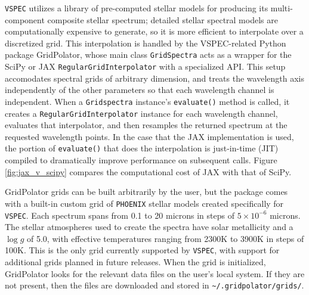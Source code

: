 \documentclass[twocolumn,linenumbers]{aastex631}
\newcommand{\teff}{$T_{\rm eff}$}
\newcommand{\TJ}[1]{\textcolor{tedcommentcolor}{#1}}
\newcommand{\vspec}[1]{\texttt{VSPEC}#1}
\begin{document}
\vspec{} utilizes a library of pre-computed stellar models for producing its multi-component composite stellar spectrum; detailed stellar spectral models are computationally expensive to generate, so it is more efficient to interpolate over a discretized grid. This interpolation is handled by the VSPEC-related Python package GridPolator, whose main class \texttt{GridSpectra} acts as a wrapper for the SciPy \citep{virtanen2020} or JAX \citep{bradbury2018} \texttt{RegularGridInterpolator} with a specialized API. This setup accomodates spectral grids of arbitrary dimension, and treats the wavelength axis independently of the other parameters so that each wavelength channel is independent. When a \texttt{Gridspectra} instance's \texttt{evaluate()} method is called, it creates a \texttt{RegularGridInterpolator} instance for each wavelength channel, evaluates that interpolator, and then resamples the returned spectrum at the requested wavelength points. In the case that the JAX implementation is used, the portion of \texttt{evaluate()} that does the interpolation is just-in-time (JIT) compiled to dramatically improve performance on subsequent calls. Figure \ref{fig:jax_v_scipy} compares the computational cost of JAX with that of SciPy.

GridPolator grids can be built arbitrarily by the user, but the package comes with a built-in custom grid of \texttt{PHOENIX} stellar models \citep{allard1994,hauschildt1999,husser2013} created specifically for \vspec{}. Each spectrum spans from 0.1 to 20 microns in steps of $5\times10^{-6}$ microns. The stellar atmospheres used to create the spectra have solar metallicity and a $\log{g}$ of 5.0, with effective temperatures ranging from 2300K to 3900K in steps of 100K. This is the only grid currently supported by \vspec{}, with support for additional grids planned in future releases.
When the grid is initialized, GridPolator looks for the relevant data files on the user's local system. If they are not present, then the files are downloaded and stored in \texttt{\textasciitilde /.gridpolator/grids/}. 
\end{document}
